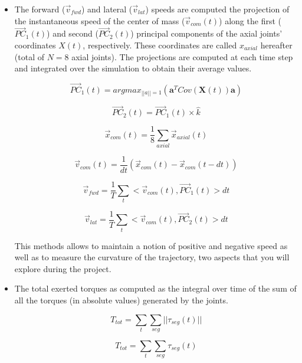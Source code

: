 \documentclass{cmc}
\begin{document}
\begin{itemize}
\item The forward ($\vec{v}_{fwd}$) and lateral ($\vec{v}_{lat}$) speeds are computed the projection of the instantaneous speed of the center of mass ($\vec{v}_{com}(t)$)
along the first ($\vec{PC}_1(t)$) and second ($\vec{PC}_2(t)$) principal components of the axial joints' coordinates $X(t)$, respectively. These coordinates are called $x_{axial}$ hereafter (total of $N=8$ axial joints). The projections are computed at each time step and integrated over the simulation to obtain their average values.

\begin{equation}
  \label{eq:pca1}
  \vec{PC}_1(t) = argmax_{||a||=1}(\boldsymbol{a}^T Cov(\boldsymbol{X}(t)) \boldsymbol{a})
\end{equation}

\begin{equation}
  \label{eq:pca2}
  \vec{PC}_2(t) = \vec{PC}_1(t) \times \hat{k}
\end{equation}

\begin{equation}
  \label{eq:xcom}
  \vec{x}_{com}(t) = \frac{1}{8} \sum_{axial} \vec{x}_{axial}(t)
\end{equation}


\begin{equation}
  \label{eq:vcom}
  \vec{v}_{com}(t) = \frac{1}{dt} (\vec{x}_{com}(t) - \vec{x}_{com}(t-dt))
\end{equation}

\begin{equation}
  \label{eq:vfwd}
  \vec{v}_{fwd} = \frac{1}{T} \sum_t < \vec{v}_{com}(t), \vec{PC}_1(t) > dt
\end{equation}

\begin{equation}
  \label{eq:vlat}
  \vec{v}_{lat} = \frac{1}{T} \sum_t < \vec{v}_{com}(t), \vec{PC}_2(t) > dt
\end{equation}

This methods allows to maintain a notion of positive and negative speed as well as to measure
the curvature of the trajectory, two aspects that you will explore during the project.

\item The total exerted torques as computed as the integral over time of the sum of all the torques (in absolute values)
generated by the joints.

\begin{equation}
  \label{eq:torques}
  T_{tot} = \sum_t \sum_{seg} || \tau_{seg}(t) ||
\end{equation}

\begin{equation}
  \label{eq:torques}
  T_{tot} = \sum_t \sum_{seg} \tau_{seg}(t)
\end{equation}


\end{itemize}
\end{document}
